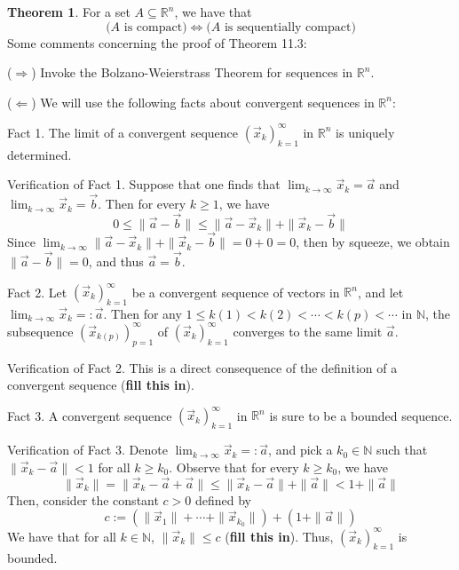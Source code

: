 \documentclass[11pt]{article}
\theoremstyle{definition}
\newtheorem{thm}{Theorem}[section]
\newcommand{\N}{\ensuremath{\mathbb{N}}}
\newcommand{\R}{\ensuremath{\mathbb{R}}}
\begin{document}
\begin{thm}
For a set $A \subseteq \R^n$, we have that
\[ \Big( \text{$A$ is compact} \Big) \Leftrightarrow \Big( \text{$A$ is sequentially compact} \Big) \]
Some comments concerning the proof of Theorem 11.3:

($\Rightarrow$) Invoke the Bolzano-Weierstrass Theorem for sequences in $\R^n$.

($\Leftarrow$) We will use the following facts about convergent sequences in $\R^n$:

{\sc Fact 1.} The limit of a convergent sequence $(\vec{x}_k)_{k=1}^\infty$ in $\R^n$ is uniquely determined.

{\sc Verification of Fact 1.} Suppose that one finds that $\lim_{k\to\infty} \vec{x}_k = \vec{a}$ and $\lim_{k\to\infty} \vec{x}_k = \vec{b}$. Then for every $k \geq 1$, we have
\[ 0 \leq \|\vec{a} - \vec{b}\| \leq \|\vec{a} - \vec{x}_k\| + \|\vec{x}_k - \vec{b}\| \]
Since $\lim_{k\to\infty} \|\vec{a} - \vec{x}_k\| + \|\vec{x}_k - \vec{b}\| = 0 + 0 = 0$, then by squeeze, we obtain $\|\vec{a} - \vec{b}\| = 0$, and thus $\vec{a} = \vec{b}$.

{\sc Fact 2.} Let $(\vec{x}_k)_{k=1}^\infty$ be a convergent sequence of vectors in $\R^n$, and let $\lim_{k\to\infty} \vec{x}_k =: \vec{a}$. Then for any $1 \leq k(1) < k(2) < \cdots < k(p) < \cdots$ in $\N$, the subsequence $(\vec{x}_{k(p)})_{p=1}^\infty$ of $(\vec{x}_k)_{k=1}^\infty$ converges to the same limit $\vec{a}$.

{\sc Verification of Fact 2.} This is a direct consequence of the definition of a convergent sequence ({\bf fill this in}).

{\sc Fact 3.} A convergent sequence $(\vec{x}_k)_{k=1}^\infty$ in $\R^n$ is sure to be a bounded sequence.

{\sc Verification of Fact 3.} Denote $\lim_{k\to\infty} \vec{x}_k =: \vec{a}$, and pick a $k_0 \in \N$ such that $\|\vec{x}_k - \vec{a}\| < 1$ for all $k \geq k_0$. Observe that for every $k \geq k_0$, we have
\[ \| \vec{x}_k \| = \| \vec{x}_k - \vec{a} + \vec{a} \| \leq \| \vec{x}_k - \vec{a} \| + \| \vec{a} \| < 1 + \| \vec{a} \| \]
Then, consider the constant $c > 0$ defined by
\[ c := \left( \| \vec{x}_1 \| + \cdots + \| \vec{x}_{k_0} \| \right) + \left( 1 + \| \vec{a} \| \right) \]
We have that for all $k \in \N$, $\| \vec{x}_k \| \leq c$ ({\bf fill this in}). Thus, $(\vec{x}_k)_{k=1}^\infty$ is bounded.
\end{thm}
\end{document}
